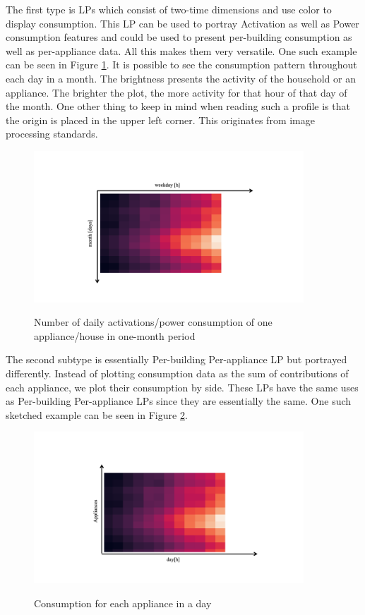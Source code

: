 The first type is LPs which consist of two-time dimensions and use color to display consumption.
This LP can be used to portray Activation as well as Power consumption features and could be used to present per-building consumption as well as per-appliance data.
All this makes them very versatile.
One such example can be seen in Figure \ref{fig:heatmap_2dtime}. 
It is possible to see the consumption pattern throughout each day in a month.
The brightness presents the activity of the household or an appliance. 
The brighter the plot, the more activity for that hour of that day of the month.
One other thing to keep in mind when reading such a profile is that the origin is placed in the upper left corner.
This originates from image processing standards.

\begin{figure}[H]
	\centering
	\caption{Number of daily activations/power consumption of one appliance/house in one-month period}
	\includegraphics[width=0.9\textwidth]{Figures/profile_sketches/Slide10.png}
	\label{fig:heatmap_2dtime}
\end{figure}

The second subtype is essentially Per-building Per-appliance LP but portrayed differently.
Instead of plotting consumption data as the sum of contributions of each appliance, we plot their consumption by side.
These LPs have the same uses as Per-building Per-appliance LPs since they are essentially the same.
One such sketched example can be seen in Figure \ref{fig:heatmap_all_appl}.

\begin{figure}[H]
	\centering
	\caption{Consumption for each appliance in a day}
	\includegraphics[width=0.9\textwidth]{Figures/profile_sketches/Slide12.png}
	\label{fig:heatmap_all_appl}
\end{figure}

